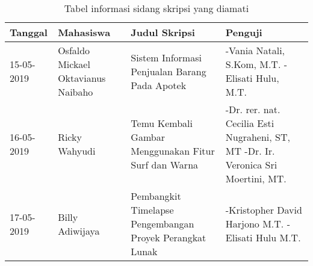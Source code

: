 \begin{table}[H]
	\renewcommand{\arraystretch}{1.5}
	\caption {Tabel informasi sidang skripsi yang diamati} 	
	\label{tab:pengamatan_sidang1}
	\begin{center}
		\begin{tabular}{|p{2 cm}|>{\raggedright} p{3.5 cm}| p{4.5 cm}| p{4.5 cm}|}
		\hline
		Tanggal & Mahasiswa & Judul Skripsi & Penguji \\ 
		\hline
		15-05-2019 & Osfaldo Mickael Oktavianus Naibaho & Sistem Informasi Penjualan Barang Pada Apotek & -Vania Natali, S.Kom, M.T. \newline -Elisati Hulu, M.T. \newline \\ 
		\hline
		16-05-2019 & Ricky Wahyudi & Temu Kembali Gambar Menggunakan Fitur Surf dan Warna & -Dr. rer. nat. Cecilia Esti Nugraheni, ST, MT \newline -Dr. Ir. Veronica Sri Moertini, MT. \newline \\ 
		\hline
		17-05-2019 & Billy Adiwijaya & Pembangkit Timelapse Pengembangan Proyek Perangkat Lunak & -Kristopher David Harjono M.T. \newline -Elisati Hulu M.T. \newline \\ 		
		\hline
		\end{tabular}
	\end{center}
\end{table}

